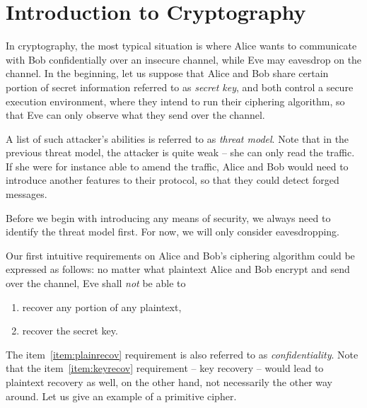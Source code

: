 \section{Introduction to Cryptography}
\label{sec:introcrypto}

In cryptography, the most typical situation is where Alice wants to communicate with Bob confidentially over an insecure channel, while Eve may eavesdrop on the channel. In the beginning, let us suppose that Alice and Bob share certain portion of secret information referred to as {\em secret key}, and both control a secure execution environment, where they intend to run their ciphering algorithm, so that Eve can only observe what they send over the channel.

\begin{note}
\label{note:threat}
	A list of such attacker's abilities is referred to as {\em threat model}. Note that in the previous threat model, the attacker is quite weak -- she can only read the traffic. If she were for instance able to amend the traffic, Alice and Bob would need to introduce another features to their protocol, so that they could detect forged messages.
	
	Before we begin with introducing any means of security, we always need to identify the threat model first. For now, we will only consider eavesdropping.
\end{note}

Our first intuitive requirements on Alice and Bob's ciphering algorithm could be expressed as follows: no matter what plaintext Alice and Bob encrypt and send over the channel, Eve shall {\em not} be able to
\begin{enumerate}
	\item recover any portion of any plaintext, \label{item:plainrecov}
	\item recover the secret key. \label{item:keyrecov}
\end{enumerate}
The item~\ref{item:plainrecov} requirement is also referred to as {\em confidentiality}. Note that the item~\ref{item:keyrecov} requirement -- key recovery -- would lead to plaintext recovery as well, on the other hand, not necessarily the other way around. Let us give an example of a primitive cipher.

